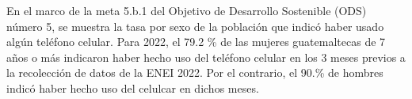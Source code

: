 En el marco de la meta 5.b.1 del Objetivo de Desarrollo Sostenible (ODS) número 5, se muestra la tasa por sexo de la población que indicó haber usado algún teléfono celular. Para 2022, el 79.2 \% de las mujeres guatemaltecas de 7 años o más indicaron haber hecho uso del teléfono celular en los 3 meses previos a la recolección de datos de la ENEI 2022. Por el contrario, el 90.\% de hombres indicó haber hecho uso del celulcar en dichos meses. 
